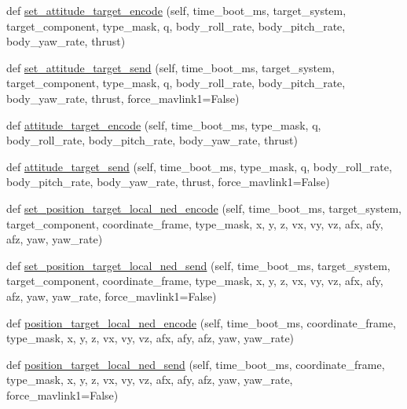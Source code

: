 \begin{DoxyCompactItemize}
\item 
def \hyperlink{classpymavlink_1_1dialects_1_1v10_1_1MAVLink_aec8e5dddc7663ffa886597fc6c365174}{set\+\_\+attitude\+\_\+target\+\_\+encode} (self, time\+\_\+boot\+\_\+ms, target\+\_\+system, target\+\_\+component, type\+\_\+mask, q, body\+\_\+roll\+\_\+rate, body\+\_\+pitch\+\_\+rate, body\+\_\+yaw\+\_\+rate, thrust)
\item 
def \hyperlink{classpymavlink_1_1dialects_1_1v10_1_1MAVLink_a37f9af7c6b9ed18ae0a9aa64b8d7cc14}{set\+\_\+attitude\+\_\+target\+\_\+send} (self, time\+\_\+boot\+\_\+ms, target\+\_\+system, target\+\_\+component, type\+\_\+mask, q, body\+\_\+roll\+\_\+rate, body\+\_\+pitch\+\_\+rate, body\+\_\+yaw\+\_\+rate, thrust, force\+\_\+mavlink1=False)
\item 
def \hyperlink{classpymavlink_1_1dialects_1_1v10_1_1MAVLink_a1708bace57d5fa8cf33121e9db3321c8}{attitude\+\_\+target\+\_\+encode} (self, time\+\_\+boot\+\_\+ms, type\+\_\+mask, q, body\+\_\+roll\+\_\+rate, body\+\_\+pitch\+\_\+rate, body\+\_\+yaw\+\_\+rate, thrust)
\item 
def \hyperlink{classpymavlink_1_1dialects_1_1v10_1_1MAVLink_afcc79f0f274531eb0d3948116004d625}{attitude\+\_\+target\+\_\+send} (self, time\+\_\+boot\+\_\+ms, type\+\_\+mask, q, body\+\_\+roll\+\_\+rate, body\+\_\+pitch\+\_\+rate, body\+\_\+yaw\+\_\+rate, thrust, force\+\_\+mavlink1=False)
\item 
def \hyperlink{classpymavlink_1_1dialects_1_1v10_1_1MAVLink_aa9bbd66ea78d8ea7e4f7548dddb02baf}{set\+\_\+position\+\_\+target\+\_\+local\+\_\+ned\+\_\+encode} (self, time\+\_\+boot\+\_\+ms, target\+\_\+system, target\+\_\+component, coordinate\+\_\+frame, type\+\_\+mask, x, y, z, vx, vy, vz, afx, afy, afz, yaw, yaw\+\_\+rate)
\item 
def \hyperlink{classpymavlink_1_1dialects_1_1v10_1_1MAVLink_ada1793642499fb48e9bc5b6b25b7a8f3}{set\+\_\+position\+\_\+target\+\_\+local\+\_\+ned\+\_\+send} (self, time\+\_\+boot\+\_\+ms, target\+\_\+system, target\+\_\+component, coordinate\+\_\+frame, type\+\_\+mask, x, y, z, vx, vy, vz, afx, afy, afz, yaw, yaw\+\_\+rate, force\+\_\+mavlink1=False)
\item 
def \hyperlink{classpymavlink_1_1dialects_1_1v10_1_1MAVLink_a057b9208437b52840ff274810955698a}{position\+\_\+target\+\_\+local\+\_\+ned\+\_\+encode} (self, time\+\_\+boot\+\_\+ms, coordinate\+\_\+frame, type\+\_\+mask, x, y, z, vx, vy, vz, afx, afy, afz, yaw, yaw\+\_\+rate)
\item 
def \hyperlink{classpymavlink_1_1dialects_1_1v10_1_1MAVLink_a2c5869b321c71629faa5be6224bad932}{position\+\_\+target\+\_\+local\+\_\+ned\+\_\+send} (self, time\+\_\+boot\+\_\+ms, coordinate\+\_\+frame, type\+\_\+mask, x, y, z, vx, vy, vz, afx, afy, afz, yaw, yaw\+\_\+rate, force\+\_\+mavlink1=False)

\end{DoxyCompactItemize}
